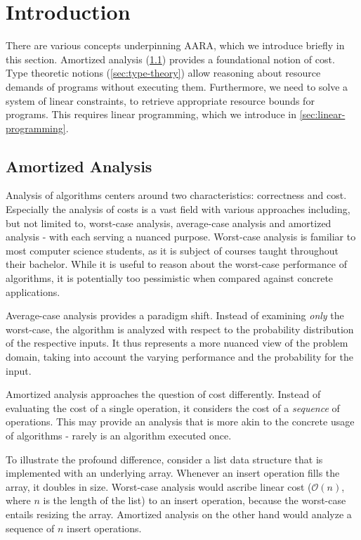 \chapter{Introduction} \label{chap:preliminaries}

There are various concepts underpinning AARA, which we introduce briefly in this section. Amortized analysis (\cref{sec:amortized-analysis}) provides a foundational notion of cost. Type theoretic notions (\cref{sec:type-theory}) allow reasoning about resource demands of programs without executing them. Furthermore, we need to solve a system of linear constraints, to retrieve appropriate resource bounds for programs. This requires linear programming, which we introduce in \cref{sec:linear-programming}. 

\section{Amortized Analysis}\label{sec:amortized-analysis}

Analysis of algorithms centers around two characteristics: correctness and cost. Especially the analysis of costs is a vast field with various approaches including, but not limited to, worst-case analysis, average-case analysis and amortized analysis - with each serving a nuanced purpose. Worst-case analysis is familiar to most computer science students, as it is subject of courses taught throughout their bachelor. While it is useful to reason about the worst-case performance of algorithms, it is potentially too pessimistic when compared against concrete applications. 

Average-case analysis provides a paradigm shift. Instead of examining \emph{only} the worst-case, the algorithm is analyzed with respect to the probability distribution of the respective inputs. It thus represents a more nuanced view of the problem domain, taking into account the varying performance and the probability for the input. 

Amortized analysis approaches the question of cost differently. Instead of evaluating the cost of a single operation, it considers the cost of a \emph{sequence} of operations. This may provide an analysis that is more akin to the concrete usage of algorithms - rarely is an algorithm executed once.

To illustrate the profound difference, consider a list data structure that is implemented with an underlying array. Whenever an insert operation fills the array, it doubles in size. Worst-case analysis would ascribe linear cost (\(\mathcal{O}(n)\), where \(n\) is the length of the list) to an insert operation, because the worst-case entails resizing the array. Amortized analysis on the other hand would analyze a sequence of \(n\) insert operations.

